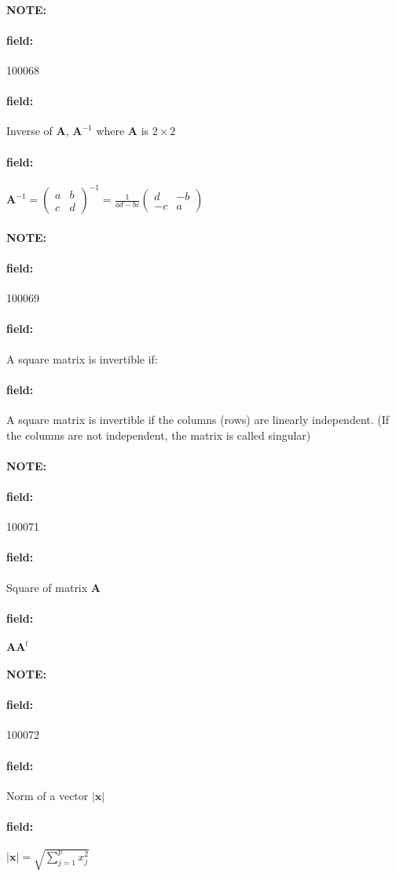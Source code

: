 \documentclass[12pt]{article}
\newenvironment{note}{\paragraph{NOTE:}}{}
\newenvironment{field}{\paragraph{field:}}{}
\begin{document}
\begin{note} \begin{field} \tiny 100068 \end{field}
  \begin{field}
    Inverse of $\mathbf{A}$, $\mathbf{A}^{-1}$ where $\mathbf{A}$ is $2 \times 2$
  \end{field}
  \begin{field}
    $\mathbf{A}^{-1} = \begin{pmatrix}
      a & b \\ c & d
    \end{pmatrix}^{-1} = \frac{1}{ad - bc}\begin{pmatrix}
      d & -b \\ -c & a
    \end{pmatrix}$
  \end{field}
\end{note}

\begin{note} \begin{field} \tiny 100069 \end{field}
  \begin{field}
    A square matrix is invertible if:
  \end{field}
  \begin{field}
    A square matrix is invertible if the columns (rows) are linearly independent. (If the columns are not independent, the matrix is called singular)
  \end{field}
\end{note}

\begin{note} \begin{field} \tiny 100071 \end{field}
  \begin{field}
    Square of matrix $\mathbf{A}$
  \end{field}
  \begin{field}
    $\mathbf{AA}^t$
  \end{field}
\end{note}

\begin{note} \begin{field} \tiny 100072 \end{field}
  \begin{field}
    Norm of a vector $|\mathbf{x}|$
  \end{field}
  \begin{field}
    $|\mathbf{x}| = \sqrt{\sum_{j=1}^p x_j^2}$
  \end{field}
\end{note}
\end{document}
